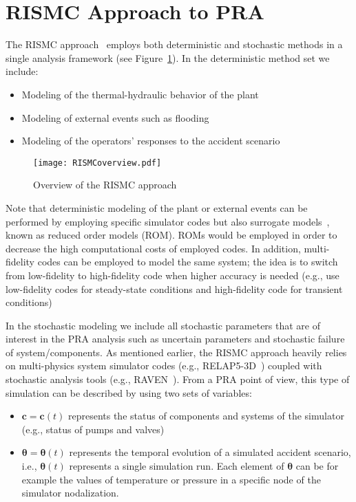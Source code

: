 \section{RISMC Approach to PRA}
\label{sec:rismc}

The RISMC approach~\cite{RISMC} employs both deterministic and stochastic methods 
in a single analysis framework (see Figure~\ref{fig:RISMCoverview}). In the deterministic method 
set we include:
\begin{itemize}
  \item Modeling of the thermal-hydraulic behavior of the plant~\cite{BWR_SBO_Mandelli,BWRanalysis}
  \item Modeling of external events such as flooding~\cite{mandelliPSA2015}
  \item Modeling of the operators’ responses to the accident scenario~\cite{HRA_BoringReport2014}
\end{itemize}

\begin{figure}
    \centering
    \centerline{\texttt{[image: RISMCoverview.pdf]}}
    \caption{Overview of the RISMC approach}
    \label{fig:RISMCoverview}
\end{figure}

Note that deterministic modeling of the plant or external events can be performed by employing specific 
simulator codes but also surrogate models~\cite{ROM}, known as reduced order models (ROM). ROMs would 
be employed 
in order to decrease the high computational costs of employed codes. In addition, multi-fidelity codes 
can be employed to model the same system; the idea is to switch from low-fidelity to high-fidelity code 
when higher accuracy is needed (e.g., use low-fidelity codes for steady-state conditions and high-fidelity 
code for transient conditions)

In the stochastic modeling we include all stochastic parameters that are of interest in the PRA analysis 
such as uncertain parameters and stochastic failure of system/components.
As mentioned earlier, the RISMC approach heavily relies on multi-physics system simulator codes 
(e.g., RELAP5-3D~\cite{relap5}) coupled with stochastic analysis tools (e.g., RAVEN~\cite{raven}).  
From a PRA point of view, this type of simulation can be described by using two sets of variables:
\begin{itemize}
  \item $\boldsymbol c = \boldsymbol c(t)$ represents the status of components and systems of the simulator 
        (e.g., status of pumps and valves)
  \item $\boldsymbol \theta = \boldsymbol \theta (t)$ represents the temporal evolution of a simulated 
        accident scenario, i.e., $\boldsymbol \theta (t)$ represents a single simulation run. 
        Each element of $\boldsymbol \theta$ can be for example the values of temperature or pressure in 
        a specific node of the simulator nodalization.
\end{itemize}

